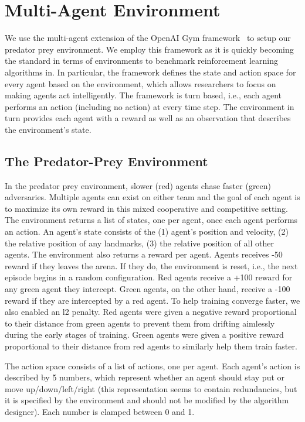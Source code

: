 
\section{Multi-Agent Environment}

We use the multi-agent extension of the OpenAI Gym framework~\cite{gym.openai16} to setup our predator prey environment. We employ this framework as it is quickly becoming the standard in terms of environments to benchmark reinforcement learning algorithms in. In particular, the framework defines the state and action space for every agent based on the environment, which allows researchers to focus on making agents act intelligently. The framework is turn based, i.e., each agent performs an action (including no action) at every time step. The environment in turn provides each agent with a reward as well as an observation that describes the environment's state.

\subsection{The Predator-Prey Environment}

In the predator prey environment, slower (red) agents chase faster (green) adversaries. Multiple agents can exist on either team and the goal of each agent is to maximize its own reward in this mixed cooperative and competitive setting. The environment returns a list of states, one per agent, once each agent performs an action. An agent's state consists of the (1) agent's position and velocity, (2) the relative position of any landmarks, (3) the relative position of all other agents. The environment also returns a reward per agent. Agents receives -50 reward if they leaves the arena. If they do, the environment is reset, i.e., the next episode begins in a random configuration. Red agents receive a +100 reward for any green agent they intercept. Green agents, on the other hand, receive a -100 reward if they are intercepted by a red agent. To help training converge faster, we also enabled an l2 penalty. Red agents were given a negative reward proportional to their distance from green agents to prevent them from drifting aimlessly during the early stages of training. Green agents were given a positive reward proportional to their distance from red agents to similarly help them train faster.

The action space consists of a list of actions, one per agent. Each agent's action is described by 5 numbers, which represent whether an agent should stay put or move up/down/left/right (this representation seems to contain redundancies, but it is specified by the environment and should not be modified by the algorithm designer). Each number is clamped between 0 and 1. 

